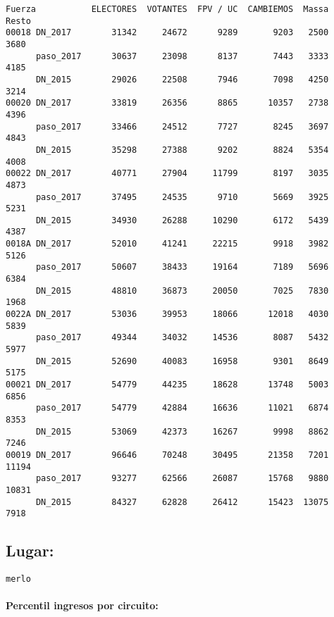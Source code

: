 \documentclass[11pt]{article}
\begin{document}
    \begin{verbatim}
Fuerza           ELECTORES  VOTANTES  FPV / UC  CAMBIEMOS  Massa  Resto
00018 DN_2017        31342     24672      9289       9203   2500   3680
      paso_2017      30637     23098      8137       7443   3333   4185
      DN_2015        29026     22508      7946       7098   4250   3214
00020 DN_2017        33819     26356      8865      10357   2738   4396
      paso_2017      33466     24512      7727       8245   3697   4843
      DN_2015        35298     27388      9202       8824   5354   4008
00022 DN_2017        40771     27904     11799       8197   3035   4873
      paso_2017      37495     24535      9710       5669   3925   5231
      DN_2015        34930     26288     10290       6172   5439   4387
0018A DN_2017        52010     41241     22215       9918   3982   5126
      paso_2017      50607     38433     19164       7189   5696   6384
      DN_2015        48810     36873     20050       7025   7830   1968
0022A DN_2017        53036     39953     18066      12018   4030   5839
      paso_2017      49344     34032     14536       8087   5432   5977
      DN_2015        52690     40083     16958       9301   8649   5175
00021 DN_2017        54779     44235     18628      13748   5003   6856
      paso_2017      54779     42884     16636      11021   6874   8353
      DN_2015        53069     42373     16267       9998   8862   7246
00019 DN_2017        96646     70248     30495      21358   7201  11194
      paso_2017      93277     62566     26087      15768   9880  10831
      DN_2015        84327     62828     26412      15423  13075   7918
    \end{verbatim}

    
    \hypertarget{lugar}{%
\subsection{Lugar:}\label{lugar}}

    
    \begin{Verbatim}[commandchars=\\\{\}]
merlo

    \end{Verbatim}

    \hypertarget{percentil-ingresos-por-circuito}{%
\paragraph{Percentil ingresos por
circuito:}\label{percentil-ingresos-por-circuito}}
\end{document}
